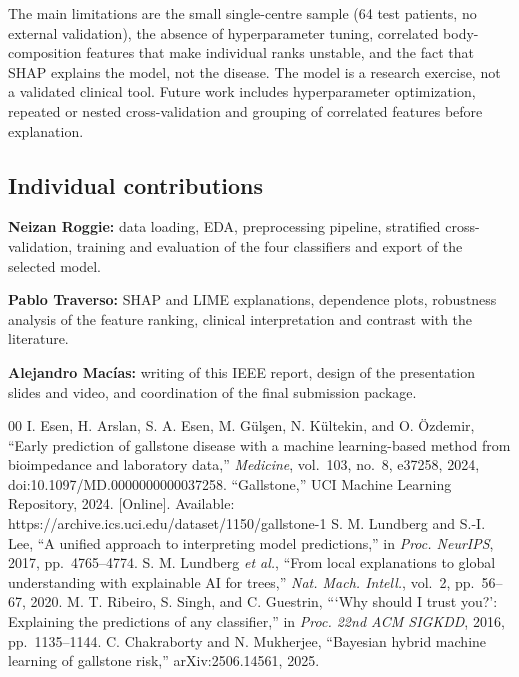 \documentclass[conference]{IEEEtran}
\begin{document}
The main limitations are the small single-centre sample (64 test patients, no external validation), the absence of hyperparameter tuning, correlated body-composition features that make individual ranks unstable, and the fact that SHAP explains the model, not the disease. The model is a research exercise, not a validated clinical tool. Future work includes hyperparameter optimization, repeated or nested cross-validation and grouping of correlated features before explanation.

\subsection{Individual contributions}
\textbf{Neizan Roggie:} data loading, EDA, preprocessing pipeline, stratified cross-validation, training and evaluation of the four classifiers and export of the selected model.

\textbf{Pablo Traverso:} SHAP and LIME explanations, dependence plots, robustness analysis of the feature ranking, clinical interpretation and contrast with the literature.

\textbf{Alejandro Mac\'ias:} writing of this IEEE report, design of the presentation slides and video, and coordination of the final submission package.

\begin{thebibliography}{00}
 I. Esen, H. Arslan, S. A. Esen, M. G\"ul\c{s}en, N. K\"ultekin, and O. \"Ozdemir, ``Early prediction of gallstone disease with a machine learning-based method from bioimpedance and laboratory data,'' \textit{Medicine}, vol.~103, no.~8, e37258, 2024, doi:10.1097/MD.0000000000037258.
 ``Gallstone,'' UCI Machine Learning Repository, 2024. [Online]. Available: https://archive.ics.uci.edu/dataset/1150/gallstone-1
 S. M. Lundberg and S.-I. Lee, ``A unified approach to interpreting model predictions,'' in \textit{Proc. NeurIPS}, 2017, pp.~4765--4774.
 S. M. Lundberg \textit{et al.}, ``From local explanations to global understanding with explainable AI for trees,'' \textit{Nat. Mach. Intell.}, vol.~2, pp.~56--67, 2020.
 M. T. Ribeiro, S. Singh, and C. Guestrin, ```Why should I trust you?': Explaining the predictions of any classifier,'' in \textit{Proc. 22nd ACM SIGKDD}, 2016, pp.~1135--1144.
 C. Chakraborty and N. Mukherjee, ``Bayesian hybrid machine learning of gallstone risk,'' arXiv:2506.14561, 2025.
\end{thebibliography}
\end{document}
